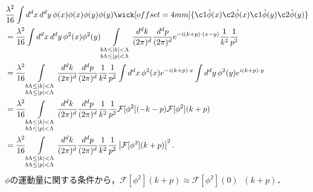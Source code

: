 \begin{align*}
  & \frac{\lambda^2}{16} \int d^dx \,d^dy \, \phi(x) \phi(x) \phi(y) \phi(y)
  \wick[offset=4mm]{ \c1{\hat\phi}(x) \c2{\hat\phi}(x) \c1{\hat\phi}(y) \c2{\hat\phi}(y) } \\
  &= \frac{\lambda^2}{16} \int d^dx \, d^dy \, \phi^2(x) \phi^2(y)
  \int\displaylimits_{\substack{b\Lambda \leq \lvert k \rvert < \Lambda \\ b\Lambda \leq \lvert p \rvert < \Lambda}} \frac{d^dk}{(2\pi)^d} \frac{d^dp}{(2\pi)^d}
  e^{-i(k+p) \cdot (x-y)} \frac{1}{k^2} \frac{1}{p^2} \\
  &= \frac{\lambda^2}{16}
  \int\displaylimits_{\substack{b\Lambda \leq \lvert k \rvert < \Lambda \\ b\Lambda \leq \lvert p \rvert < \Lambda}} \frac{d^dk}{(2\pi)^d} \frac{d^dp}{(2\pi)^d} \frac{1}{k^2} \frac{1}{p^2}
  \int d^dx \, \phi^2(x) e^{-i(k+p) \cdot x} \int d^dy \, \phi^2(y) e^{i(k+p) \cdot y} \\
  &= \frac{\lambda^2}{16}
  \int\displaylimits_{\substack{b\Lambda \leq \lvert k \rvert < \Lambda \\ b\Lambda \leq \lvert p \rvert < \Lambda}} \frac{d^dk}{(2\pi)^d} \frac{d^dp}{(2\pi)^d} \frac{1}{k^2} \frac{1}{p^2}
  \mathcal{F}[\phi^2](-k-p) \mathcal{F}[\phi^2](k+p) \\
  &= \frac{\lambda^2}{16}
  \int\displaylimits_{\substack{b\Lambda \leq \lvert k \rvert < \Lambda \\ b\Lambda \leq \lvert p \rvert < \Lambda}} \frac{d^dk}{(2\pi)^d} \frac{d^dp}{(2\pi)^d} \frac{1}{k^2} \frac{1}{p^2}
  \left\lvert \mathcal{F}[\phi^2](k+p) \right\rvert^2 .
\end{align*}
$\phi$の運動量に関する条件から，$\mathcal{F}[\phi^2](k+p) \approx \mathcal{F}[\phi^2](0) \mathop{\delta^{(d)}}(k+p)$．
\begin{center}
\end{center}
